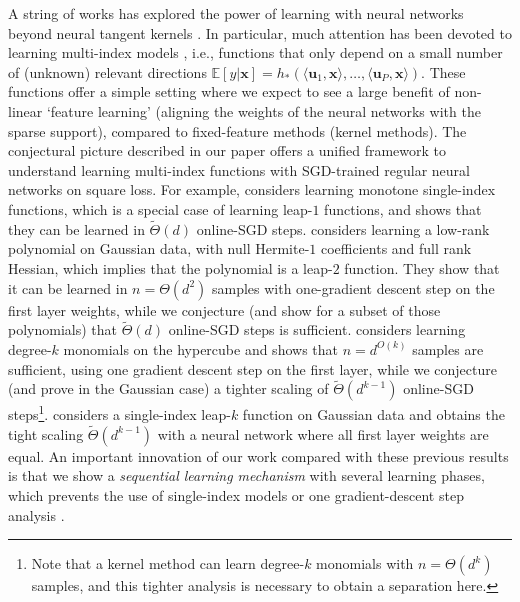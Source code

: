 \documentclass[11pt]{article}
\newcommand{\E}{\mathbb{E}}
\newcommand{\<}{\langle}
\renewcommand{\>}{\rangle}
\theoremstyle{definition}
\def\bu{{\boldsymbol u}}
\def\bx{{\boldsymbol x}}
\def\bu{{\boldsymbol u}}
\def\bx{{\boldsymbol x}}
\def\bu{{\boldsymbol u}}
\def\bu{{\boldsymbol u}}
\begin{document}
A string of works \citep{allen2019can,li2020learning,daniely2020learning,allen2020backward,suzuki2020benefit,ba2022high,ghorbani2019limitations,telgarsky2022feature} has explored the power of learning with neural networks beyond neural tangent kernels \citep{jacot2018neural}. In particular, much attention has been devoted to learning multi-index models \citep{chen2020towards,abbe2022merged,nichani2022identifying,barak2022hidden,damian2022neural,mousavi2022neural,bietti2022learning,refinetti2021classifying}, i.e., functions that only depend on a small number of (unknown) relevant directions $\E[y | \bx]=h_* ( \< \bu_1 , \bx\> , \ldots , \< \bu_P , \bx \>)$. These functions offer a simple setting where we expect to see a large benefit of non-linear `feature learning' (aligning the weights of the neural networks with the sparse support), compared to fixed-feature methods (kernel methods). The conjectural picture described in our paper offers a unified framework to understand learning multi-index functions with SGD-trained regular neural networks on square loss. For example, \cite{mousavi2022neural} considers learning monotone single-index functions, which is a special case of learning leap-$1$ functions, and shows that they can be learned in $\tilde{\Theta} (d)$ online-SGD steps. \cite{damian2022neural} considers learning a low-rank polynomial on Gaussian data, with null Hermite-$1$ coefficients and full rank Hessian, which implies that the polynomial is a leap-$2$ function. They show that it can be learned in $n = \Theta (d^2)$ samples with one-gradient descent step on the first layer weights, while we conjecture (and show for a subset of those polynomials) that $\tilde{\Theta} (d)$ online-SGD steps is sufficient. \cite{barak2022hidden} considers learning degree-$k$ monomials on the hypercube and shows that $n = d^{O(k)}$ samples are sufficient, using one gradient descent step on the first layer, while we conjecture (and prove in the Gaussian case) a tighter scaling of $\tilde{\Theta} (d^{k-1})$ online-SGD steps\footnote{Note that a kernel method can learn degree-$k$ monomials with $n = \Theta (d^k)$ samples, and this tighter analysis is necessary to obtain a separation here.}. \cite{bietti2022learning} considers a single-index leap-$k$ function on Gaussian data and obtains the tight scaling $\tilde{\Theta} (d^{k-1})$ with a neural network where all first layer weights are equal. An important innovation of our work compared with these previous results is that we show a \textit{sequential learning mechanism} with several learning phases, which prevents the use of single-index models \citep{bietti2022learning} or one gradient-descent step analysis \citep{daniely2020learning,barak2022hidden,damian2022neural}.
\end{document}
